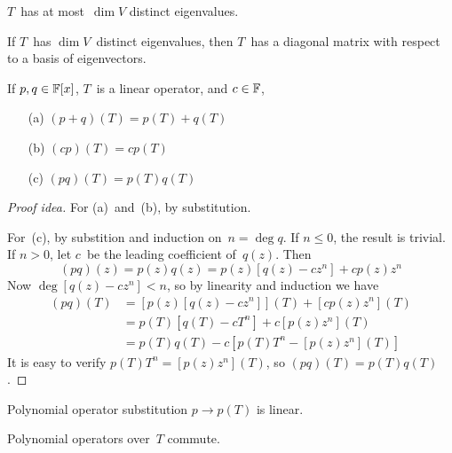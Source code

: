 \begin{cor}
\(T\)~has at most~\(\dim V\) distinct eigenvalues.
\end{cor}

\begin{cor}
If \(T\)~has \(\dim V\)~distinct eigenvalues, then \(T\)~has a diagonal matrix with respect to a basis of eigenvectors.
\end{cor}

\begin{thm}
If \(p,q\in\mathbb{F}[x]\), \(T\)~is a linear operator, and \(c\in\mathbb{F}\),
\begin{enumerate}[itemsep=0pt]
\item[(a)] \((p+q)(T)=p(T)+q(T)\)
\item[(b)] \((cp)(T)=cp(T)\)
\item[(c)] \((pq)(T)=p(T)q(T)\)
\end{enumerate}
\end{thm}
\begin{proof}[Proof idea]
For (a)~and~(b), by substitution.

For~(c), by substition and induction on~\(n=\deg q\). If \(n\le0\), the result is trivial. If \(n>0\), let \(c\)~be the leading coefficient of~\(q(z)\). Then
\[(pq)(z)=p(z)q(z)=p(z)[q(z)-cz^n]+cp(z)z^n\]
Now \(\deg[q(z)-cz^n]<n\), so by linearity and induction we have
\begin{align*}
(pq)(T)&=[p(z)[q(z)-cz^n]](T)+[cp(z)z^n](T)\\
	&=p(T)[q(T)-cT^n]+c[p(z)z^n](T)\\
	&=p(T)q(T)-c[p(T)T^n-[p(z)z^n](T)]
\end{align*}
It is easy to verify \(p(T)T^n=[p(z)z^n](T)\), so \((pq)(T)=p(T)q(T)\).
\end{proof}
\begin{cor}
Polynomial operator substitution \(p\to p(T)\) is linear.
\end{cor}
\begin{cor}
Polynomial operators over~\(T\) commute.
\end{cor}

